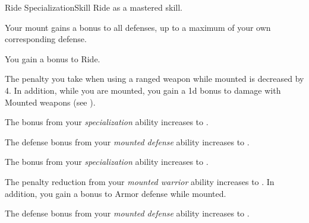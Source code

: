     \begin{feat}{Ride Specialization}{Skill}
        \featpre Ride as a mastered skill.

         Your mount gains a  bonus to all defenses, up to a maximum of your own corresponding defense.

         You gain a  bonus to Ride.

         The penalty you take when using a ranged weapon while mounted is decreased by 4.
        In addition, while you are mounted, you gain a \plus1d bonus to damage with Mounted weapons (see ).

         The bonus from your \textit{specialization} ability increases to .

         The defense bonus from your \textit{mounted defense} ability increases to .

         The bonus from your \textit{specialization} ability increases to .

         The penalty reduction from your \textit{mounted warrior} ability increases to .
        In addition, you gain a  bonus to Armor defense while mounted.

         The defense bonus from your \textit{mounted defense} ability increases to .
    \end{feat}

